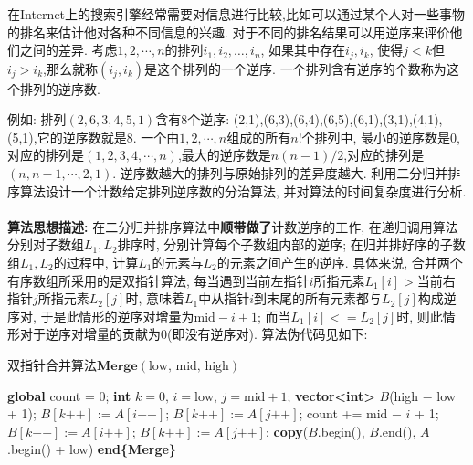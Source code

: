 \documentclass{article}
\begin{document}
\begin{homeworkProblem}
	在Internet上的搜索引擎经常需要对信息进行比较,比如可以通过某个人对一些事物的排名来估计他对各种不同信息的兴趣. 对于不同的排名结果可以用逆序来评价他们之间的差异. 考虑$1,2,\cdots,n$的排列$i_1,i_2,…,i_n$, 如果其中存在$i_j,i_k$, 使得$j<k$但$i_j>i_k$,那么就称$(i_j,i_k)$是这个排列的一个逆序. 一个排列含有逆序的个数称为这个排列的逆序数. 
	
	例如: 排列$(2 ,6 ,3 ,4 ,5 ,1)$含有8个逆序: (2,1),(6,3),(6,4),(6,5),(6,1),(3,1),(4,1),(5,1),它的逆序数就是8. 一个由$1,2,\cdots,n$组成的所有$n!$个排列中, 最小的逆序数是0, 对应的排列是$(1 ,2, 3, 4, \cdots, n)$,最大的逆序数是$n(n-1)/2$,对应的排列是$(n,n-1,\cdots,2,1)$. 逆序数越大的排列与原始排列的差异度越大. 利用二分归并排序算法设计一个计数给定排列逆序数的分治算法, 并对算法的时间复杂度进行分析.
	\\

	\solution
	\\
	
	\textbf{算法思想描述:} 在二分归并排序算法中\textbf{顺带做了}计数逆序的工作, 在递归调用算法分别对子数组$L_1,L_2$排序时, 分别计算每个子数组内部的逆序; 在归并排好序的子数组$L_1,L_2$的过程中, 计算$L_1$的元素与$L_2$的元素之间产生的逆序. 具体来说, 合并两个有序数组所采用的是双指针算法, 每当遇到当前左指针$i$所指元素$L_1[i]>$当前右指针$j$所指元素$L_2[j]$时, 意味着$L_1$中从指针$i$到末尾的所有元素都与$L_2[j]$构成逆序对, 于是此情形的逆序对增量为$\text{mid}-i+1$; 而当$L_1[i]<=L_2[j]$时, 则此情形对于逆序对增量的贡献为0(即没有逆序对). 算法伪代码见如下:
	\begin{algorithm}[H]
		\caption{双指针合并算法$\textbf{Merge}(\text{low, mid, high})$}
		\label{alg:合并过程}
		\begin{algorithmic}[1]
		 
		\State \textbf{global} count = 0; 
		\State \textbf{int} $k=0,\,i=\text{low},\,j=\text{mid}+1$; 
		\State \textbf{vector<int>} $B$(high $-$ low + 1); 
		 
			\State $B[k\text{++}]:=A[i\text{++}]$; 
		  \Else
			\State $B[k\text{++}]:=A[j\text{++}]$;
			\State count += mid $-$ $i$ + 1; 
		  \EndIf
		\EndWhile
		 
		  \State $B[k\text{++}]:=A[i\text{++}]$;
		\EndWhile
		 
		  \State $B[k\text{++}]:=A[j\text{++}]$;
		\EndWhile
		\State \textbf{copy}($B$.begin(), $B$.end(), $A$.begin() + low) 
		\State \textbf{end\{Merge\}}
		\end{algorithmic}
	\end{algorithm}


\end{homeworkProblem}
\end{document}
